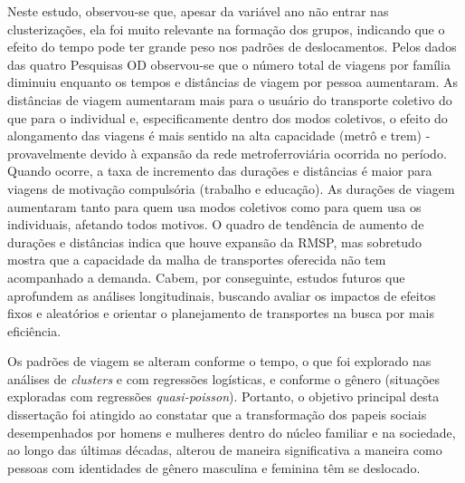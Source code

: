 Neste estudo, observou-se que, apesar da variável ano não entrar nas clusterizações, ela foi muito relevante na formação dos grupos, indicando que o efeito do tempo pode ter grande peso nos padrões de deslocamentos.
Pelos dados das quatro Pesquisas OD observou-se que o número total de viagens por família diminuiu enquanto os tempos e distâncias de viagem por pessoa aumentaram.
As distâncias de viagem aumentaram mais para o usuário do transporte coletivo do que para o individual e, especificamente dentro dos modos coletivos, o efeito do alongamento das viagens é mais sentido na alta capacidade (metrô e trem) - provavelmente devido à expansão da rede metroferroviária ocorrida no período.
Quando ocorre, a taxa de incremento das durações e distâncias é maior para viagens de motivação compulsória (trabalho e educação).
As durações de viagem aumentaram tanto para quem usa modos coletivos como para quem usa os individuais, afetando todos motivos.
O quadro de tendência de aumento de durações e distâncias indica que houve expansão da RMSP, mas sobretudo mostra que a capacidade da malha de transportes oferecida não tem acompanhado a demanda.
Cabem, por conseguinte, estudos futuros que aprofundem as análises longitudinais, buscando avaliar os impactos de efeitos fixos e aleatórios e orientar o planejamento de transportes na busca por mais eficiência.


Os padrões de viagem se alteram conforme o tempo, o que foi explorado nas análises de \textit{clusters} e com regressões logísticas, e conforme o gênero (situações exploradas com regressões \textit{quasi-poisson}). 
Portanto, o objetivo principal desta dissertação foi atingido ao constatar que a transformação dos papeis sociais desempenhados por homens e mulheres dentro do núcleo familiar e na sociedade, ao longo das últimas décadas, alterou de maneira significativa a maneira como pessoas com identidades de gênero masculina e feminina têm se deslocado.

  

